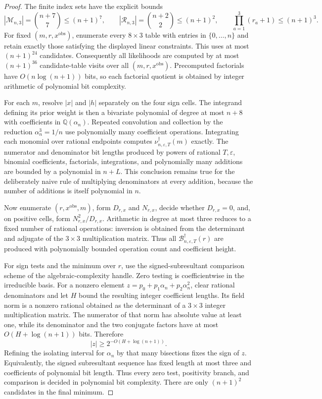\documentclass{article}
\begin{document}
{\begin{proof}
The finite index sets have the explicit bounds
\[
|\mathcal M_{n,3}|={n+7\choose7}\le(n+1)^7,\qquad
|\mathcal R_{n,3}|={n+2\choose2}\le(n+1)^2,\qquad
\prod_{a=1}^3(r_a+1)\le(n+1)^3.
\]
For fixed \((m,r,x^{\mathrm{obs}})\), enumerate every \(8\times3\) table with entries in \(\{0,\ldots,n\}\) and retain exactly those satisfying the displayed linear constraints.  This uses at most \((n+1)^{24}\) candidates.  Consequently all likelihoods are computed by at most \((n+1)^{36}\) candidate-table visits over all \((m,r,x^{\mathrm{obs}})\).  Precomputed factorials have \(O(n\log(n+1))\) bits, so each factorial quotient is obtained by integer arithmetic of polynomial bit complexity.

For each \(m\), resolve \(|x|\) and \(|h|\) separately on the four sign cells.  The integrand defining its prior weight is then a bivariate polynomial of degree at most \(n+8\) with coefficients in \(\mathbb Q(\alpha_n)\).  Repeated convolution and collection by the reduction \(\alpha_n^3=1/n\) use polynomially many coefficient operations.  Integrating each monomial over rational endpoints computes \(\nu_{n,\varepsilon,T}^\dagger(m)\) exactly.  The numerator and denominator bit lengths produced by powers of rational \(T,\varepsilon\), binomial coefficients, factorials, integrations, and polynomially many additions are bounded by a polynomial in \(n+L\).  This conclusion remains true for the deliberately naive rule of multiplying denominators at every addition, because the number of additions is itself polynomial in \(n\).

Now enumerate \((r,x^{\mathrm{obs}},m)\), form \(D_{r,x}\) and \(N_{r,x}\), decide whether \(D_{r,x}=0\), and, on positive cells, form \(N_{r,x}^2/D_{r,x}\).  Arithmetic in degree at most three reduces to a fixed number of rational operations: inversion is obtained from the determinant and adjugate of the \(3\times3\) multiplication matrix.  Thus all \(\mathcal B_{n,\varepsilon,T}^\dagger(r)\) are produced with polynomially bounded operation count and coefficient height.

For sign tests and the minimum over \(r\), use the signed-subresultant comparison scheme of the algebraic-complexity handle.  Zero testing is coefficientwise in the irreducible basis.  For a nonzero element \(z=p_0+p_1\alpha_n+p_2\alpha_n^2\), clear rational denominators and let \(H\) bound the resulting integer coefficient lengths.  Its field norm is a nonzero rational obtained as the determinant of a \(3\times3\) integer multiplication matrix.  The numerator of that norm has absolute value at least one, while its denominator and the two conjugate factors have at most \(O(H+\log(n+1))\) bits.  Therefore
\[
|z|\ge2^{-O(H+\log(n+1))}.
\]
Refining the isolating interval for \(\alpha_n\) by that many bisections fixes the sign of \(z\).  Equivalently, the signed subresultant sequence has fixed length at most three and coefficients of polynomial bit length.  Thus every zero test, positivity branch, and comparison is decided in polynomial bit complexity.  There are only \((n+1)^2\) candidates in the final minimum.


\end{proof}}
\end{document}
